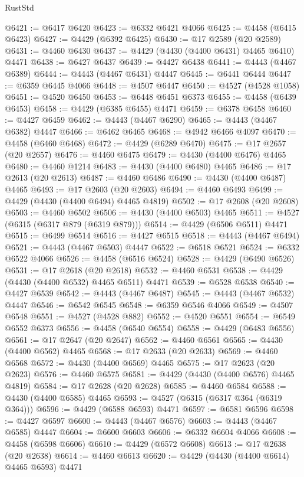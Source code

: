 \begin{lexlean}{RustStd}
\begin{coremodule}
@6421 := @6417 @6420
@6423 := @6332 @6421 @4066
@6425 := @4458 (@6415 @6423)
@6427 := @4429 (@6392 @6425)
@6430 := @17 @2589 (@20 @2589)
@6431 := @4460 @6430
@6437 := @4429 (@4430 (@4400 @6431) @4465 @6410) @4471
@6438 := @6427 @6437
@6439 := @4427 @6438
@6441 := @4443 (@4467 @6389)
@6444 := @4443 (@4467 @6431) @4447
@6445 := @6441 @6444
@6447 := @6359 @6445 @4066
@6448 := @4507 @6447
@6450 := @4527 (@4528 @1058)
@6451 := @4520 @6450
@6453 := @6448 @6451 @6373
@6455 := @4458 (@6439 @6453)
@6458 := @4429 (@6385 @6455) @4471
@6459 := @6378 @6458
@6460 := @4427 @6459
@6462 := @4443 (@4467 @6290)
@6465 := @4443 (@4467 @6382) @4447
@6466 := @6462 @6465
@6468 := @4942 @6466 @4097
@6470 := @4458 (@6460 @6468)
@6472 := @4429 (@6289 @6470)
@6475 := @17 @2657 (@20 @2657)
@6476 := @4460 @6475
@6479 := @4430 (@4400 @6476) @4465
@6480 := @4460 @1214
@6483 := @4430 (@4400 @6480) @4465
@6486 := @17 @2613 (@20 @2613)
@6487 := @4460 @6486
@6490 := @4430 (@4400 @6487) @4465
@6493 := @17 @2603 (@20 @2603)
@6494 := @4460 @6493
@6499 := @4429 (@4430 (@4400 @6494) @4465 @4819)
@6502 := @17 @2608 (@20 @2608)
@6503 := @4460 @6502
@6506 := @4430 (@4400 @6503) @4465
@6511 := @4527 (@6315 (@6317 @879 (@6319 @879)))
@6514 := @4429 (@6506 @6511) @4471
@6515 := @6499 @6514
@6516 := @4427 @6515
@6518 := @4443 (@4467 @6494)
@6521 := @4443 (@4467 @6503) @4447
@6522 := @6518 @6521
@6524 := @6332 @6522 @4066
@6526 := @4458 (@6516 @6524)
@6528 := @4429 (@6490 @6526)
@6531 := @17 @2618 (@20 @2618)
@6532 := @4460 @6531
@6538 := @4429 (@4430 (@4400 @6532) @4465 @6511) @4471
@6539 := @6528 @6538
@6540 := @4427 @6539
@6542 := @4443 (@4467 @6487)
@6545 := @4443 (@4467 @6532) @4447
@6546 := @6542 @6545
@6548 := @6359 @6546 @4066
@6549 := @4507 @6548
@6551 := @4527 (@4528 @882)
@6552 := @4520 @6551
@6554 := @6549 @6552 @6373
@6556 := @4458 (@6540 @6554)
@6558 := @4429 (@6483 @6556)
@6561 := @17 @2647 (@20 @2647)
@6562 := @4460 @6561
@6565 := @4430 (@4400 @6562) @4465
@6568 := @17 @2633 (@20 @2633)
@6569 := @4460 @6568
@6572 := @4430 (@4400 @6569) @4465
@6575 := @17 @2623 (@20 @2623)
@6576 := @4460 @6575
@6581 := @4429 (@4430 (@4400 @6576) @4465 @4819)
@6584 := @17 @2628 (@20 @2628)
@6585 := @4460 @6584
@6588 := @4430 (@4400 @6585) @4465
@6593 := @4527 (@6315 (@6317 @364 (@6319 @364)))
@6596 := @4429 (@6588 @6593) @4471
@6597 := @6581 @6596
@6598 := @4427 @6597
@6600 := @4443 (@4467 @6576)
@6603 := @4443 (@4467 @6585) @4447
@6604 := @6600 @6603
@6606 := @6332 @6604 @4066
@6608 := @4458 (@6598 @6606)
@6610 := @4429 (@6572 @6608)
@6613 := @17 @2638 (@20 @2638)
@6614 := @4460 @6613
@6620 := @4429 (@4430 (@4400 @6614) @4465 @6593) @4471

\end{coremodule}
\end{lexlean}
